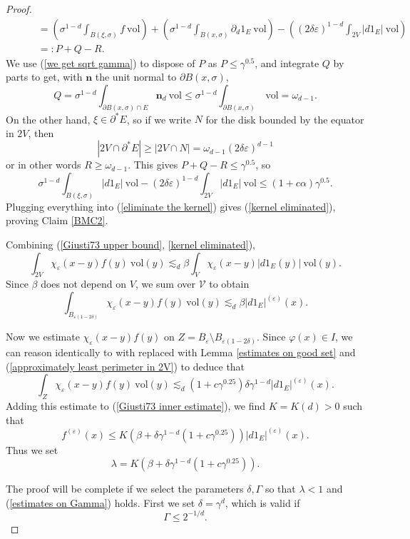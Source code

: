 \documentclass[reqno,12pt,letterpaper]{amsart}
\newcommand{\normal}{\mathbf n}
\newcommand{\vol}{\mathrm{vol}}
\theoremstyle{definition}
\numberwithin{equation}{section}
\begin{document}
\begin{proof}
\begin{align*}
&\qquad = \left(\sigma^{1 - d} \int_{B(\xi, \sigma)} f ~\vol\right) + \left(\sigma^{1 - d} \int_{B(x, \sigma)} \partial_d 1_E ~\vol\right) - \left((2\delta\varepsilon)^{1 - d} \int_{2V} |d1_E| ~\vol\right)\\
&\qquad=: P + Q - R.
\end{align*}
We use (\ref{we get sqrt gamma}) to dispose of $P$ as $P \leq \gamma^{0.5}$, and integrate $Q$ by parts to get, with $\normal$ the unit normal to $\partial B(x, \sigma)$,
$$Q = \sigma^{1 - d} \int_{\partial B(x, \sigma) \cap E} \normal_d ~\vol \leq \sigma^{1 - d} \int_{\partial B(x, \sigma)} ~\vol = \omega_{d - 1}.$$
On the other hand, $\xi \in \partial^* E$, so if we write $N$ for the disk bounded by the equator in $2V$, then
$$|2V \cap \partial^* E| \geq |2V \cap N| = \omega_{d - 1}(2\delta\varepsilon)^{d - 1}$$
or in other words $R \geq \omega_{d - 1}$.
This gives $P + Q - R \leq \gamma^{0.5}$, so
$$\sigma^{1 - d} \int_{B(\xi, \sigma)} |d1_E| ~\vol - (2\delta\varepsilon)^{1 - d} \int_{2V} |d1_E| ~\vol \leq (1 + c\alpha)\gamma^{0.5}.$$
Plugging everything into (\ref{eliminate the kernel}) gives (\ref{kernel eliminated}), proving Claim \ref{BMC2}.

Combining (\ref{Giusti73 upper bound}, \ref{kernel eliminated}),
$$\int_{2V} \chi_\varepsilon(x - y)f(y) ~\vol(y) \lesssim_d \beta \int_V \chi_\varepsilon(x - y)|d1_E(y)| ~\vol(y).$$
Since $\beta$ does not depend on $V$, we sum over $\mathcal V$ to obtain
\begin{equation}\label{Giusti73 inner estimate}
\int_{B_{\varepsilon(1 - 2\delta)}} \chi_\varepsilon(x - y)f(y) ~\vol(y) \lesssim_d \beta |d1_E|^{(\varepsilon)}(x).
\end{equation}

Now we estimate $\chi_\varepsilon(x - y)f(y)$ on $Z = B_\varepsilon \setminus B_{\varepsilon(1 - 2\delta)}$.
Since $\varphi(x) \in I$, we can reason identically to \cite[p92]{Giusti77} with \cite[(5.14)]{Giusti77} replaced with Lemma \ref{estimates on good set} and (\ref{approximately least perimeter in 2V}) to deduce that
$$\int_Z \chi_\varepsilon(x - y)f(y) ~\vol(y) \lesssim_d (1 + c\gamma^{0.25}) \delta \gamma^{1 - d} |d1_E|^{(\varepsilon)}(x).$$
Adding this estimate to (\ref{Giusti73 inner estimate}), we find $K = K(d) > 0$ such that
$$f^{(\varepsilon)}(x) \leq K(\beta + \delta \gamma^{1 - d}(1 + c\gamma^{0.25}))|d1_E|^{(\varepsilon)}(x).$$
Thus we set
$$\lambda = K(\beta + \delta \gamma^{1 - d}(1 + c\gamma^{0.25})).$$

The proof will be complete if we select the parameters $\delta,\Gamma$ so that $\lambda < 1$ and (\ref{estimates on Gamma}) holds.
First we set $\delta = \gamma^d$, which is valid if
\begin{equation}\label{hypotheses on gamma 2}
\Gamma \leq 2^{-1/d}.
\end{equation}


\end{proof}
\end{document}
